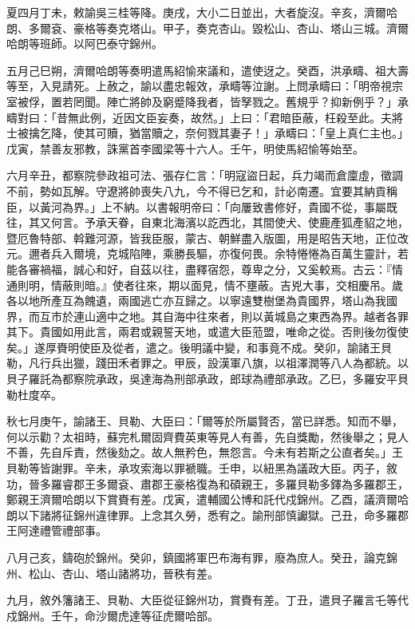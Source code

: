 \begin{pinyinscope}
夏四月丁未，敕諭吳三桂等降。庚戌，大小二日並出，大者旋沒。辛亥，濟爾哈朗、多爾袞、豪格等奏克塔山。甲子，奏克杏山。毀松山、杏山、塔山三城。濟爾哈朗等班師。以阿巴泰守錦州。

五月己巳朔，濟爾哈朗等奏明遣馬紹愉來議和，遣使迓之。癸酉，洪承疇、祖大壽等至，入見請死。上赦之，諭以盡忠報效，承疇等泣謝。上問承疇曰：「明帝視宗室被俘，置若罔聞。陣亡將帥及窮蹙降我者，皆孥戮之。舊規乎？抑新例乎？」承疇對曰：「昔無此例，近因文臣妄奏，故然。」上曰：「君暗臣蔽，枉殺至此。夫將士被擒乞降，使其可贖，猶當贖之，奈何戮其妻子！」承疇曰：「皇上真仁主也。」戊寅，禁善友邪教，誅黨首李國梁等十六人。壬午，明使馬紹愉等始至。

六月辛丑，都察院參政祖可法、張存仁言：「明寇盜日起，兵力竭而倉廩虛，徵調不前，勢如瓦解。守遼將帥喪失八九，今不得已乞和，計必南遷。宜要其納貢稱臣，以黃河為界。」上不納。以書報明帝曰：「向屢致書修好，貴國不從，事屬既往，其又何言。予承天眷，自東北海濱以訖西北，其間使犬、使鹿產狐產貂之地，暨厄魯特部、斡難河源，皆我臣服，蒙古、朝鮮盡入版圖，用是昭告天地，正位改元。邇者兵入爾境，克城陷陣，乘勝長驅，亦復何畏。余特惓惓為百萬生靈計，若能各審禍福，誠心和好，自茲以往，盡釋宿怨，尊卑之分，又奚較焉。古云：『情通則明，情蔽則暗。』使者往來，期以面見，情不壅蔽。吉兇大事，交相慶吊。歲各以地所產互為餽遺，兩國逃亡亦互歸之。以寧遠雙樹堡為貴國界，塔山為我國界，而互市於連山適中之地。其自海中往來者，則以黃城島之東西為界。越者各罪其下。貴國如用此言，兩君或親誓天地，或遣大臣蒞盟，唯命之從。否則後勿復使矣。」遂厚賚明使臣及從者，遣之。後明議中變，和事竟不成。癸卯，諭諸王貝勒，凡行兵出獵，踐田禾者罪之。甲辰，設漢軍八旗，以祖澤潤等八人為都統。以貝子羅託為都察院承政，吳達海為刑部承政，郎球為禮部承政。乙巳，多羅安平貝勒杜度卒。

秋七月庚午，諭諸王、貝勒、大臣曰：「爾等於所屬賢否，當已詳悉。知而不舉，何以示勸？太祖時，蘇完札爾固齊費英東等見人有善，先自獎勵，然後舉之；見人不善，先自斥責，然後劾之。故人無矜色，無怨言。今未有若斯之公直者矣。」王貝勒等皆謝罪。辛未，承攻索海以罪褫職。壬申，以紐黑為議政大臣。丙子，敘功，晉多羅睿郡王多爾袞、肅郡王豪格復為和碩親王，多羅貝勒多鐸為多羅郡王，鄭親王濟爾哈朗以下賞賚有差。戊寅，遣輔國公博和託代戍錦州。乙酉，議濟爾哈朗以下諸將征錦州違律罪。上念其久勞，悉宥之。諭刑部慎讞獄。己丑，命多羅郡王阿達禮管禮部事。

八月己亥，鑄砲於錦州。癸卯，鎮國將軍巴布海有罪，廢為庶人。癸丑，論克錦州、松山、杏山、塔山諸將功，晉秩有差。

九月，敘外籓諸王、貝勒、大臣從征錦州功，賞賚有差。丁丑，遣貝子羅言乇等代戍錦州。壬午，命沙爾虎達等征虎爾哈部。


\end{pinyinscope}
